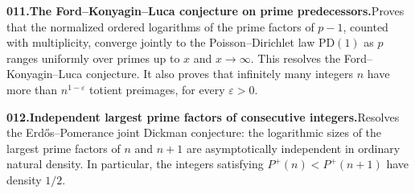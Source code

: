\documentclass[11pt,a4paper]{article}
\begin{document}
  \par \begin{minipage}{\linewidth}
  \fontsize{10.5}{12.6}\selectfont\RaggedRight
  \hypertarget{result 011}{}
  {\bfseries\textcolor{muted}{011.}\enspace The Ford--Konyagin--Luca conjecture on prime predecessors.}\enspace Proves that the normalized ordered logarithms of the prime factors of $p-1$, counted with multiplicity, converge jointly to the Poisson--Dirichlet law $\mathrm{PD}(1)$ as $p$ ranges uniformly over primes up to $x$ and $x\to\infty$. This resolves the Ford--Konyagin--Luca conjecture. It also proves that infinitely many integers $n$ have more than $n^{1-\varepsilon}$ totient preimages, for every $\varepsilon>0$.\par
  \end{minipage}\par\vspace{5pt}



  \par \begin{minipage}{\linewidth}
  \fontsize{10.5}{12.6}\selectfont\RaggedRight
  \hypertarget{result 012}{}
  {\bfseries\textcolor{muted}{012.}\enspace Independent largest prime factors of consecutive integers.}\enspace Resolves the Erd\H{o}s--Pomerance joint Dickman conjecture: the logarithmic sizes of the largest prime factors of $n$ and $n+1$ are asymptotically independent in ordinary natural density. In particular, the integers satisfying $P^+(n)<P^+(n+1)$ have density $1/2$.\par
  \end{minipage}\par\vspace{5pt}
\end{document}
